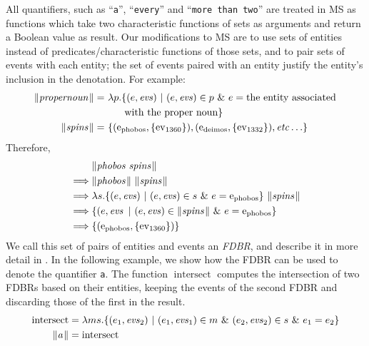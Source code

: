 \documentclass[../main.tex]{subfiles}
\begin{document}
\begin{refsection}
All quantifiers, such as ``\texttt{a}'', ``\texttt{every}'' and ``\texttt{more than two}'' are treated in MS as functions which take two characteristic functions of sets as arguments and return a Boolean value as result. Our modifications to MS are to use sets of entities instead of predicates/characteristic functions of those sets, and to pair sets of events with each entity; the set of events paired with an entity justify the entity’s inclusion in the denotation. For example:
\begin{equation*}
	\begin{split}
		\meaningof{propernoun} =&\ \lambda p.
		\{(e, \evs)\ |\ (e, \evs) \in p\ \&\ e = \dmathrm{the\ entity\ associated} \\ & \qquad \dmathrm{with\ the\ proper\ noun}\} \\
		\meaningof{spins} =&\ \{(\entityassoc{phobos}, \{\eventassoc{1360}\}), (\entityassoc{deimos}, \{\eventassoc{1332}\}), \etc\}
	\end{split}
\end{equation*}
Therefore,
\begin{equation*}
	\begin{split}
		& \meaningof{phobos spins} \\
		\implies& \meaningof{phobos}\ \meaningof{spins} \\
		\implies& \lambda s.\{(e, \evs)\ |\ (e, \evs) \in s\ \&\ e = \entityassoc{phobos}\}\ \meaningof{spins} \\
		\implies& \{(e, \evs\ |\ (e, \evs) \in \meaningof{spins}\ \&\ e = \entityassoc{phobos}\}\ \\
		\implies& \{(\entityassoc{phobos}, \{\eventassoc{1360}\})\}
	\end{split}
\end{equation*}
We call this set of pairs of entities and events an \textit{FDBR}, and describe it in more detail in .
In the following example, we show how the FDBR can be used to denote the quantifier \texttt{a}.  The function $\operatorname{intersect}$ computes the intersection of two FDBRs based on their entities, keeping the events of the second FDBR and discarding those of the first in the result.
\begin{equation*}
	\begin{split}
		\operatorname{intersect} &= \lambda ms.\{(e_1,\evs_2)\ |\ (e_1,\evs_1) \in m\ \&\ (e_2,\evs_2) \in s\ \&\ e_1 = e_2\} \\
		\meaningof{a} &= \operatorname{intersect}

\end{split}
\end{equation*}
\end{refsection}
\end{document}
